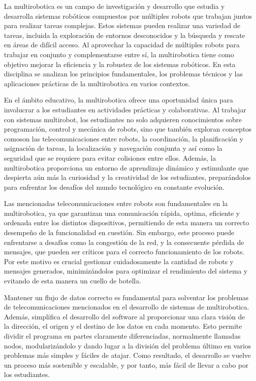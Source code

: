 La multirobotica es un campo de investigación y desarrollo que estudia y
desarrolla sistemas robóticos compuestos por múltiples robots que trabajan
juntos para realizar tareas complejas.
Estos sistemas pueden realizar una variedad de tareas, incluida la exploración
de entornos desconocidos y la búsqueda y rescate en áreas de difícil acceso.
Al aprovechar la capacidad de múltiples robots para trabajar en conjunto y
complementarse entre sí, la multirobotica tiene como objetivo mejorar la
eficiencia y la robustez de los sistemas robóticos.
En esta disciplina se analizan los principios fundamentales, los problemas
técnicos y las aplicaciones prácticas de la multirobotica en varios contextos.

En el ámbito educativo, la multirobotica ofrece una oportunidad única para
involucrar a los estudiantes en actividades prácticas y colaborativas.
Al trabajar con sistemas multirobot, los estudiantes no solo adquieren
conocimientos sobre programación, control y mecánica de robots, sino que también
exploran conceptos comoson las telecomunicaciones entre robots, la coordinación,
la planificación y asignación de tareas, la localización y navegación conjunta y
así como la seguridad que se requiere para evitar colisiones entre ellos.
Además, la multirobotica proporciona un entorno de aprendizaje dinámico y
estimulante que despierta aún más la curiosidad y la creatividad de los
estudiantes, preparándolos para enfrentar los desafíos del mundo tecnológico en
constante evolución.

Las mencionadas telecomunicaciones entre robots son fundamentales en la
multirobotica, ya que garantizan una comunicación rápida, optima,
eficiente y ordenada entre los distintos dispositivos, permitiendo de esta
manera un correcto desempeño de la funcionalidad en cuestión.
Sin embargo, este proceso puede enfrentarse a desafíos como la congestión de la
red, y la consecuente pérdida de mensajes, que pueden ser críticos para el
correcto funcionamiento de los robots.
Por este motivo es crucial gestionar cuidadosamente la cantidad de robots y
mensajes generados, minimizándolos para optimizar el rendimiento del sistema y
evitando de esta manera un cuello de botella.

Mantener un flujo de datos correcto es fundamental para solventar los problemas
de telecomunicaciones mencionados en el desarrollo de sistemas de multirobotica.
Además, simplifica el desarrollo del software al proporcionar una clara visión
de la dirección, el origen y el destino de los datos en cada momento.
Esto permite dividir el programa en partes claramente diferenciadas, normalmente
llamadas nodos, modularizándolo y dando lugar a la división del problema último
en varios problemas más simples y fáciles de atajar.
Como resultado, el desarrollo se vuelve un proceso más sostenible y escalable, y
por tanto, más fácil de llevar a cabo por los estudiantes.

